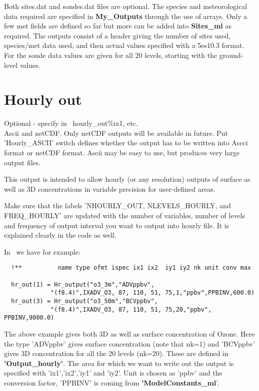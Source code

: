 Both sites.dat and sondes.dat files are optional.
\newline
The species and meteorological data required are specified in {\bf My\_Outputs}
through the use of arrays. Only a few met fields are defined so far but
more can be added into {\bf Sites\_ml} as required. The outputs consist
of a header giving the number of sites used, species/met data used, and
then actual values specified with a 5es10.3 format. For the sonde data
values are given for all 20 levels, starting with the ground-level values.


\section{Hourly out}

\noindent
Optional -  specify in \MyOutputs\, hourly\_out\%ix1, etc.\\
Ascii and netCDF.  Only netCDF outputs will be available in future. 
Put 'Hourly\_ASCII' switch defines whether the output has to be written
into Ascci format or netCDF format.  Ascii may be easy to use, but
produces very large output files.  

\vspace{1cm}

This output is intended to allow hourly (or any resolution) outputs of surface
as well as 3D concentrations in
variable precision for user-defined areas.  

Make sure that the labels 'NHOURLY\_OUT, NLEVELS\_HOURLY, and FREQ\_HOURLY' are updated with the number of
variables, number of levels and frequency of output interval you want
to output into hourly file.  It is explained clearly in the code as
well.  

 
In \MyOutputs\ we have for example:

\begin{small}
\begin{verbatim}
  !**          name type ofmt ispec ix1 ix2  iy1 iy2 nk unit conv max

  hr_out(1) = Hr_output("o3_3m","ADVppbv", 
             "(f8.4)",IXADV_O3, 87, 110, 51, 75,1,"ppbv",PPBINV,600.0)
  hr_out(3) = Hr_output("o3_50m","BCVppbv",
             "(f8.4)",IXADV_O3, 87, 110, 51, 75,20,"ppbv", PPBINV,9000.0)
\end{verbatim}
\end{small}

The above example gives both 3D as well as surface concentration of
Ozone.  Here the type 'ADVppbv' gives surface concentration (note
that nk=1) and 'BCVppbv' gives 3D concentration for all the 20 levels
(nk=20). These are defined in {\bf 'Output\_hourly'}.  The area for which we want to write out the output is
specified with 'ix1','ix2','iy1' and 'iy2'.  Unit is chosen as 'ppbv'
and the conversion factor, 'PPBINV' is coming from
{\bf 'ModelConstants\_ml}'.  


